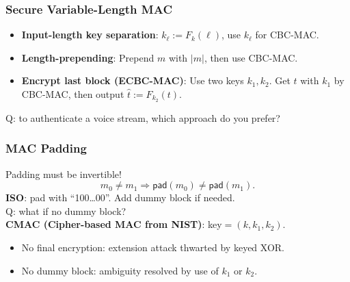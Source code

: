 \begin{frame}\frametitle{Secure Variable-Length MAC}
\begin{itemize}
\item \textbf{Input-length key separation}: $k_{\ell} := F_k(\ell)$, use $k_{\ell}$ for CBC-MAC.
\item \textbf{Length-prepending}: Prepend $m$ with $|m|$, then use CBC-MAC.
\begin{figure}
\begin{center}

\end{center}
\end{figure}
\item \textbf{Encrypt last block (ECBC-MAC)}: Use two keys $k_1, k_2$. Get $t$ with $k_1$ by CBC-MAC, then output $\hat{t} := F_{k_2}(t)$.
\end{itemize}
\alert{Q: to authenticate a voice stream, which approach do you prefer?}
\end{frame}

\begin{frame}\frametitle{MAC Padding}
Padding must be invertible!\[ m_0\neq m_1 \Rightarrow \mathsf{pad}(m_0) \neq \mathsf{pad}(m_1). \]
\textbf{ISO}: pad with ``100\dots00''. Add dummy block if needed.\\
\alert{Q: what if no dummy block?} \\
\textbf{CMAC (Cipher-based MAC from NIST)}: key$=(k,k_1,k_2)$.
\begin{figure}
\begin{center}

\end{center}
\end{figure}
\begin{itemize}
\item No final encryption: extension attack thwarted by keyed XOR.
\item No dummy block: ambiguity resolved by use of $k_1$ or $k_2$.
\end{itemize}
\end{frame}
